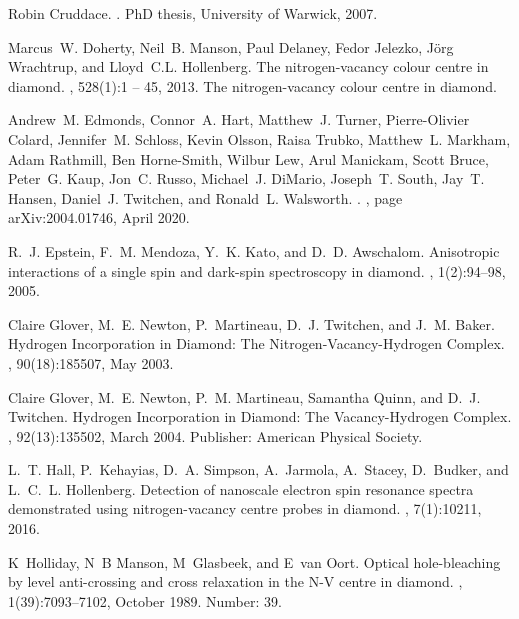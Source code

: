 \documentclass[9pt,twocolumn,twoside]{revtex4-1}
\begin{document}
\begin{thebibliography}{10}
Robin Cruddace.
.
\newblock PhD thesis, University of Warwick, 2007.

Marcus~W. Doherty, Neil~B. Manson, Paul Delaney, Fedor Jelezko, Jörg
  Wrachtrup, and Lloyd~C.L. Hollenberg.
\newblock The nitrogen-vacancy colour centre in diamond.
, 528(1):1 -- 45, 2013.
\newblock The nitrogen-vacancy colour centre in diamond.

Andrew~M. {Edmonds}, Connor~A. {Hart}, Matthew~J. {Turner}, Pierre-Olivier
  {Colard}, Jennifer~M. {Schloss}, Kevin {Olsson}, Raisa {Trubko}, Matthew~L.
  {Markham}, Adam {Rathmill}, Ben {Horne-Smith}, Wilbur {Lew}, Arul {Manickam},
  Scott {Bruce}, Peter~G. {Kaup}, Jon~C. {Russo}, Michael~J. {DiMario},
  Joseph~T. {South}, Jay~T. {Hansen}, Daniel~J. {Twitchen}, and Ronald~L.
  {Walsworth}.
.
, page arXiv:2004.01746, April 2020.

R.~J. Epstein, F.~M. Mendoza, Y.~K. Kato, and D.~D. Awschalom.
\newblock Anisotropic interactions of a single spin and dark-spin spectroscopy
  in diamond.
, 1(2):94--98, 2005.

Claire Glover, M.~E. Newton, P.~Martineau, D.~J. Twitchen, and J.~M. Baker.
\newblock Hydrogen {Incorporation} in {Diamond}: {The}
  {Nitrogen}-{Vacancy}-{Hydrogen} {Complex}.
, 90(18):185507, May 2003.

Claire Glover, M.~E. Newton, P.~M. Martineau, Samantha Quinn, and D.~J.
  Twitchen.
\newblock Hydrogen {Incorporation} in {Diamond}: {The} {Vacancy}-{Hydrogen}
  {Complex}.
, 92(13):135502, March 2004.
\newblock Publisher: American Physical Society.

L.~T. Hall, P.~Kehayias, D.~A. Simpson, A.~Jarmola, A.~Stacey, D.~Budker, and
  L.~C.~L. Hollenberg.
\newblock Detection of nanoscale electron spin resonance spectra demonstrated
  using nitrogen-vacancy centre probes in diamond.
, 7(1):10211, 2016.

K~Holliday, N~B Manson, M~Glasbeek, and E~van Oort.
\newblock Optical hole-bleaching by level anti-crossing and cross relaxation in
  the {N}-{V} centre in diamond.
, 1(39):7093--7102, October 1989.
\newblock Number: 39.


\end{thebibliography}
\end{document}
